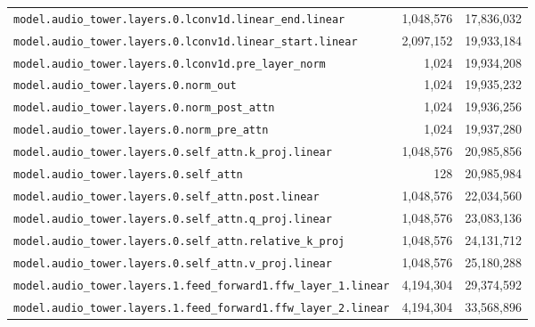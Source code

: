 \documentclass[10pt,a4paper]{article}
\theoremstyle{definition}
\begin{document}
\begin{appendices}
\begin{longtable}{p{9.5cm}rr}
\texttt{model.\allowbreak{}audio\_tower.\allowbreak{}layers.\allowbreak{}0.\allowbreak{}lconv1d.\allowbreak{}linear\_end.\allowbreak{}linear} & 1,048,576 & 17,836,032 \\
\texttt{model.\allowbreak{}audio\_tower.\allowbreak{}layers.\allowbreak{}0.\allowbreak{}lconv1d.\allowbreak{}linear\_start.\allowbreak{}linear} & 2,097,152 & 19,933,184 \\
\texttt{model.\allowbreak{}audio\_tower.\allowbreak{}layers.\allowbreak{}0.\allowbreak{}lconv1d.\allowbreak{}pre\_layer\_norm} & 1,024 & 19,934,208 \\
\texttt{model.\allowbreak{}audio\_tower.\allowbreak{}layers.\allowbreak{}0.\allowbreak{}norm\_out} & 1,024 & 19,935,232 \\
\texttt{model.\allowbreak{}audio\_tower.\allowbreak{}layers.\allowbreak{}0.\allowbreak{}norm\_post\_attn} & 1,024 & 19,936,256 \\
\texttt{model.\allowbreak{}audio\_tower.\allowbreak{}layers.\allowbreak{}0.\allowbreak{}norm\_pre\_attn} & 1,024 & 19,937,280 \\
\texttt{model.\allowbreak{}audio\_tower.\allowbreak{}layers.\allowbreak{}0.\allowbreak{}self\_attn.\allowbreak{}k\_proj.\allowbreak{}linear} & 1,048,576 & 20,985,856 \\
\texttt{model.\allowbreak{}audio\_tower.\allowbreak{}layers.\allowbreak{}0.\allowbreak{}self\_attn} & 128 & 20,985,984 \\
\texttt{model.\allowbreak{}audio\_tower.\allowbreak{}layers.\allowbreak{}0.\allowbreak{}self\_attn.\allowbreak{}post.\allowbreak{}linear} & 1,048,576 & 22,034,560 \\
\texttt{model.\allowbreak{}audio\_tower.\allowbreak{}layers.\allowbreak{}0.\allowbreak{}self\_attn.\allowbreak{}q\_proj.\allowbreak{}linear} & 1,048,576 & 23,083,136 \\
\texttt{model.\allowbreak{}audio\_tower.\allowbreak{}layers.\allowbreak{}0.\allowbreak{}self\_attn.\allowbreak{}relative\_k\_proj} & 1,048,576 & 24,131,712 \\
\texttt{model.\allowbreak{}audio\_tower.\allowbreak{}layers.\allowbreak{}0.\allowbreak{}self\_attn.\allowbreak{}v\_proj.\allowbreak{}linear} & 1,048,576 & 25,180,288 \\
\texttt{model.\allowbreak{}audio\_tower.\allowbreak{}layers.\allowbreak{}1.\allowbreak{}feed\_forward1.\allowbreak{}ffw\_layer\_1.\allowbreak{}linear} & 4,194,304 & 29,374,592 \\
\texttt{model.\allowbreak{}audio\_tower.\allowbreak{}layers.\allowbreak{}1.\allowbreak{}feed\_forward1.\allowbreak{}ffw\_layer\_2.\allowbreak{}linear} & 4,194,304 & 33,568,896 \\

\end{longtable}
\end{appendices}
\end{document}
